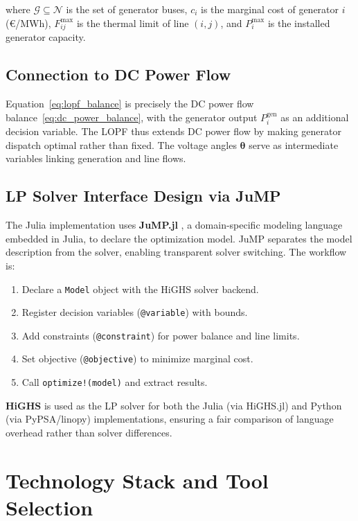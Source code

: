 where $\mathcal{G} \subseteq \mathcal{N}$ is the set of generator buses, $c_i$ is the marginal cost of generator $i$ (\euro/MWh), $F_{ij}^\text{max}$ is the thermal limit of line $(i,j)$, and $P_i^\text{max}$ is the installed generator capacity.

\subsection{Connection to DC Power Flow}

Equation~\eqref{eq:lopf_balance} is precisely the DC power flow balance~\eqref{eq:dc_power_balance}, with the generator output $P_i^\text{gen}$ as an additional decision variable. The LOPF thus extends DC power flow by making generator dispatch optimal rather than fixed. The voltage angles $\boldsymbol{\theta}$ serve as intermediate variables linking generation and line flows.

\subsection{LP Solver Interface Design via JuMP}

The Julia implementation uses \textbf{JuMP.jl} \cite{lubin2023jump}, a domain-specific modeling language embedded in Julia, to declare the optimization model. JuMP separates the model description from the solver, enabling transparent solver switching. The workflow is:

\begin{enumerate}
    \item Declare a \texttt{Model} object with the HiGHS solver backend.
    \item Register decision variables (\texttt{@variable}) with bounds.
    \item Add constraints (\texttt{@constraint}) for power balance and line limits.
    \item Set objective (\texttt{@objective}) to minimize marginal cost.
    \item Call \texttt{optimize!(model)} and extract results.
\end{enumerate}

\textbf{HiGHS} \cite{huangfu2018highs} is used as the LP solver for both the Julia (via HiGHS.jl) and Python (via PyPSA/linopy) implementations, ensuring a fair comparison of language overhead rather than solver differences.

\section{Technology Stack and Tool Selection}

